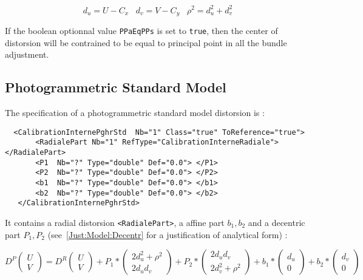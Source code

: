 \begin{equation}
    d_u =  U-C_x \;\;\; d_v=V-C_y \;\;\;
    \rho^2 = d_u ^2 + d_v ^2  
\end{equation}

If the boolean optionnal value {\tt PPaEqPPs} is set to  {\tt true}, then the center
of distorsion will be contrained to be equal to principal point in all the bundle
adjustment.


\subsection{Photogrammetric Standard Model}

\label{SpGeo:Fraser}

The specification of a photogrammetric standard model distorsion is  :


\begin{verbatim}
  <CalibrationInternePghrStd  Nb="1" Class="true" ToReference="true">
       <RadialePart Nb="1" RefType="CalibrationInterneRadiale">    </RadialePart>
       <P1  Nb="?" Type="double" Def="0.0"> </P1>
       <P2  Nb="?" Type="double" Def="0.0"> </P2>
       <b1  Nb="?" Type="double" Def="0.0"> </b1>
       <b2  Nb="?" Type="double" Def="0.0"> </b2>
   </CalibrationInternePghrStd>
\end{verbatim}

It contains a radial distorsion {\tt <RadialePart>}, a affine part $b_1, b_2$ and
a decentric part $P_1,P_2$ (see~\ref{Just:Model:Decentr} for a justification of
analytical form) :

\begin{equation}
   D^P\begin{pmatrix} U \\ V \end{pmatrix} 
      =      D^R\begin{pmatrix} U \\ V \end{pmatrix} 
          +  P_1 * \begin{pmatrix} 2d_u^2 + \rho^2 \\  2 d_u d_v \end{pmatrix}
          +  P_2 * \begin{pmatrix}   2 d_u d_v \\ 2d_v^2 + \rho^2 \end{pmatrix}
          + b_1  * \begin{pmatrix}   d_u  \\ 0  \end{pmatrix}
          + b_2  * \begin{pmatrix}   d_v  \\ 0  \end{pmatrix}
\end{equation}

